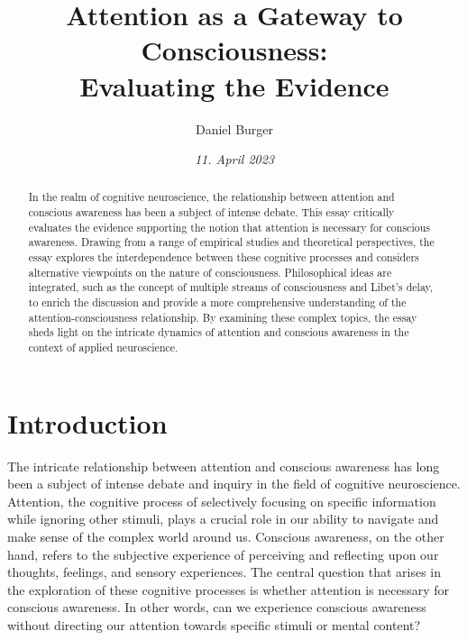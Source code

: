 \documentclass[10pt]{article}
\title{\textbf{Attention as a Gateway to Consciousness:} \\ Evaluating the Evidence}
\author[ ]{Daniel Burger}
\affil[ ]{\textbf{King’s College London}}
\affil[ ]{\href{mailto:daniel.burger@kcl.ac.uk}{daniel.burger@kcl.ac.uk}}
\date{\textit{11. April 2023}}
\begin{document}

\maketitle
\thispagestyle{empty}

\begin{sloppypar} %
  \begin{abstract}
    In the realm of cognitive neuroscience, the relationship between attention and conscious awareness has been a subject of intense debate. This essay critically evaluates the evidence supporting the notion that attention is necessary for conscious awareness. Drawing from a range of empirical studies and theoretical perspectives, the essay explores the interdependence between these cognitive processes and considers alternative viewpoints on the nature of consciousness. Philosophical ideas are integrated, such as the concept of multiple streams of consciousness and Libet’s delay, to enrich the discussion and provide a more comprehensive understanding of the attention-consciousness relationship. By examining these complex topics, the essay sheds light on the intricate dynamics of attention and conscious awareness in the context of applied neuroscience.

  \end{abstract}
  \pagebreak

  \tableofcontents
  \pagebreak

  \listoffigures
  \pagebreak

  \listoftables
  \pagebreak


  \doublespacing

  \section{Introduction}
  \label{sec:introduction}

  The intricate relationship between attention and conscious awareness has long been a subject of intense debate and inquiry in the field of cognitive neuroscience. Attention, the cognitive process of selectively focusing on specific information while ignoring other stimuli, plays a crucial role in our ability to navigate and make sense of the complex world around us. Conscious awareness, on the other hand, refers to the subjective experience of perceiving and reflecting upon our thoughts, feelings, and sensory experiences. The central question that arises in the exploration of these cognitive processes is whether attention is necessary for conscious awareness. In other words, can we experience conscious awareness without directing our attention towards specific stimuli or mental content?


\end{sloppypar}
\end{document}
